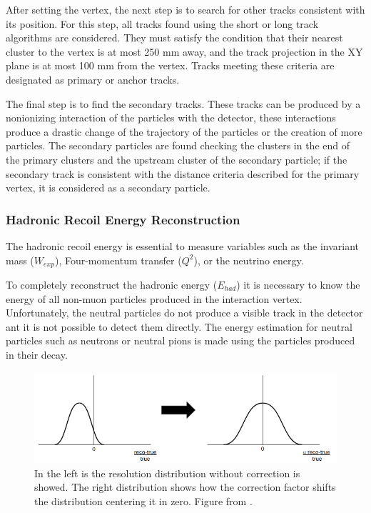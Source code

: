 After setting the vertex, the next step is to search for other tracks consistent with its position. For this step, all tracks found using the short or long track algorithms are considered. They must satisfy the condition that their nearest cluster to the vertex is at most 250 mm away, and the track projection in the XY plane is at most 100 mm from the vertex. Tracks meeting these criteria are designated as primary or anchor tracks.  

The final step is to find the secondary tracks. These tracks can be produced by a nonionizing interaction of the particles with the detector, these interactions produce a drastic change of the trajectory of the particles or the creation of more particles. The secondary particles are found checking the clusters in the end of the primary clusters and the upstream cluster of the secondary particle; if the secondary track is consistent with the distance criteria described for the primary vertex, it is considered as a secondary particle. 


\subsubsection{Hadronic Recoil Energy Reconstruction}
\label{Cap:MnvExp:MnvDetector:DataReconstruction:ENergyReconstruction}

The hadronic recoil energy is essential to measure variables such as the invariant mass ($W_{exp}$), Four-momentum transfer ($Q^2$), or the neutrino energy.

To completely reconstruct the hadronic energy ($E_{had}$) it is necessary to know the energy of all non-muon particles produced in the interaction vertex. Unfortunately, the neutral particles do not produce a visible track in the detector ant it is not possible to detect them directly. The energy estimation for neutral particles such as neutrons or neutral pions is made using the particles produced in their decay. 

\begin{figure}[!htb]
    \centering
    \includegraphics[scale=0.5]{Figures/Chapter2/CorrectionFactor.png}
    \caption{In the left is the resolution distribution without correction is showed. The right distribution shows how the correction factor shifts the distribution centering it in zero. Figure from \cite{AaronThesis}.}
    \label{fig:MnvExp:MnvDetector:DataReconstruction:EnergyRes}
\end{figure}

